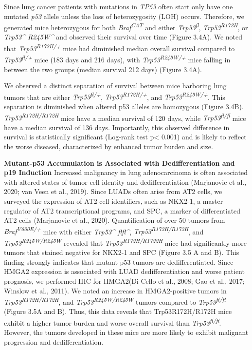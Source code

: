 Since lung cancer patients with mutations in \emph{TP53} often start only have one mutated \emph{p53} allele unless the loss of heterozygosity (LOH) occurs. Therefore, we generated mice heterozygous for both \emph{Braf\textsuperscript{CAT}} and either \emph{Trp53\textsuperscript{fl}}, \emph{Trp53\textsuperscript{R172H}}, or \emph{Trp53\^{} R245W\^{}} and observed their survival over time (Figure 3.4A). We noted that \emph{Trp53\textsuperscript{R172H/+}} mice had diminished median overall survival compared to \emph{Trp53\textsuperscript{fl/+}} mice (183 days and 216 days), with \emph{Trp53\textsuperscript{R245W/+}} mice falling in between the two groups (median survival 212 days) (Figure 3.4A).

We observed a distinct separation of survival between mice harboring lung tumors that are either \emph{Trp53\textsuperscript{fl/+}}, \emph{Trp53\textsuperscript{R172H/+}}, and \emph{Trp53\textsuperscript{R245W/+}}. This separation is diminished when altered p53 alleles are homozygous (Figure 3.4B). \emph{Trp53\textsuperscript{R172H/R172H}} mice have a median survival of 120 days, while \emph{Trp53\textsuperscript{fl/fl}} mice have a median survival of 136 days. Importantly, this observed difference in survival is statistically significant (Log-rank test p\textless{} 0.001) and is likely to reflect the worse diseased, characterized by enhanced tumor burden and size.

\textbf{Mutant-p53 Accumulation is Associated with Dedifferentiation and p19 Induction}
Increased malignancy in lung adenocarcinoma is often associated with altered states of tumor cell identity and dedifferentiation (Marjanovic et al., 2020; van Veen et al., 2019). Since LUADs often arise from AT2 cells, we surveyed the expression of AT2 cell identifiers, such as NKX2-1, a master regulator of AT2 transcriptional programs, and SPC, a marker of differentiated AT2 cells (Marjanovic et al., 2020). Quantification of over 50 tumors from \emph{Braf\textsuperscript{V600E/+}} mice with either \emph{Trp53\^{} flfl\^{}}, \emph{Trp53\textsuperscript{R172H/R172H}}, and \emph{Trp53\textsuperscript{R245W/R245W}} revealed that \emph{Trp53\textsuperscript{R172H/R1722H}} mice had significantly more tumors that stained negative for NKX2-1 and SPC (Figure 3.5 A and B). This finding strongly indicates that mutant-p53 tumors are dedifferentiated. Since HMGA2 expression is associated with LUAD dedifferentiation and worse patient prognosis, we performed IHC for HMGA2(Di Cello et al., 2008; Gao et al., 2017; Winslow et al., 2011). We noted an increase in HMGA2-positive tumors in \emph{Trp53\textsuperscript{R172H/R172H}}, and \emph{Trp53\textsuperscript{R245W/R245W}} tumors compared to \emph{Trp53\textsuperscript{fl/fl}} (Figure 3.5A and B). Thus, this data reveals that Trp53R172H/R172H mice exhibit a higher tumor burden and worse overall survival than \emph{Trp53\textsuperscript{fl/fl}}. However, the tumors developed in these mice are more likely to exhibit malignant progression and dedifferentiation.

